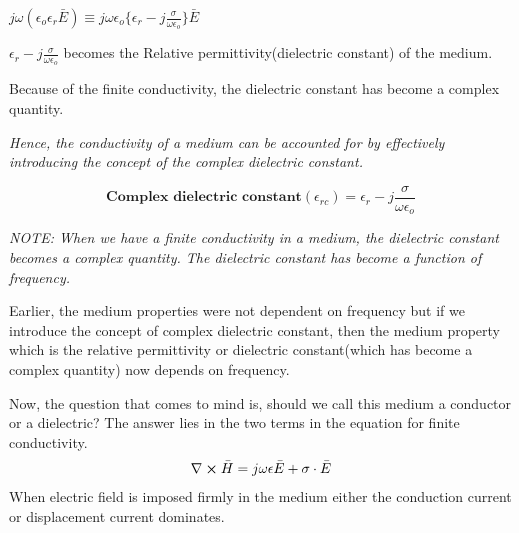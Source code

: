 \begin{center}
$j \omega(\epsilon_{o}\epsilon_{r}\bar{E}) \equiv j\omega\epsilon_{o}\bigg\{\epsilon_{r} -j \frac{\sigma}{\omega\epsilon_{o}}\bigg\}\bar{E}$ 
\end{center}

$\epsilon_{r} -j \frac{\sigma}{\omega\epsilon_{o}}$ becomes the Relative permittivity(dielectric constant) of the medium.

Because of the finite conductivity, the dielectric constant has become a complex quantity.

\textit{Hence, the conductivity of a medium can be accounted for by effectively introducing the concept of the complex dielectric constant.}

\begin{equation}
\textbf{Complex dielectric constant} (\epsilon_{rc}) = \epsilon_{r} -j \frac{\sigma}{\omega\epsilon_{o}}
\end{equation}

\textit{NOTE: When we have a finite conductivity in a medium, the dielectric constant becomes a complex quantity. The dielectric constant has become a function of frequency.}

Earlier, the medium properties were not dependent on frequency but if we introduce the concept of complex dielectric constant, then the medium property which is the relative permittivity or dielectric constant(which has become a complex quantity) now depends on frequency.

Now, the question that comes to mind is, should we call this medium a conductor or a dielectric? The answer lies in the two terms in the equation for finite conductivity.
\begin{align*}
\nabla \cross \bar{H} = j\omega\epsilon\bar{E} + \sigma\cdot\bar{E} 
\end{align*}
When electric field is imposed firmly in the medium either the conduction current or displacement current dominates.

